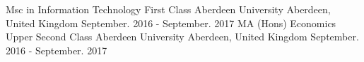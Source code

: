 

\begin{cventries}

  \cventry
    {Msc in Information Technology} %
    {First Class}
    {Aberdeen University} %
    {Aberdeen, United Kingdom} %
    {September. 2016 - September. 2017} %
  \cventry
    {MA (Hons) Economics } %
    {Upper Second Class}
    {Aberdeen University} %
    {Aberdeen, United Kingdom} %
    {September. 2016 - September. 2017} %


\end{cventries}
